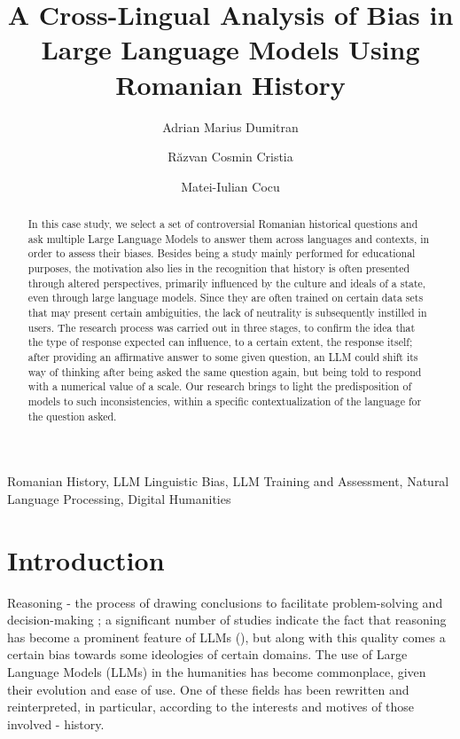 \documentclass[11pt]{article}
\title{\textbf{A Cross-Lingual Analysis of Bias in Large Language Models Using Romanian History}}
\author[1]{Adrian Marius Dumitran}
\author[2]{Răzvan Cosmin Cristia}
\author[3]{Matei-Iulian Cocu}
\affil[1]{University of Bucharest, Softbinator
\break
\texttt{marius.dumitran@unibuc.ro}}
\affil[2]{University of Bucharest
 \break
\texttt{cristiarazvan@gmail.com}}
\affil[3]{University of Bucharest
 \break
\texttt{cocu.matei24@yahoo.com}}
\date{}
\begin{document}
\maketitle
\begin{abstract}
In this case study, we select a set of controversial Romanian historical questions and ask multiple Large Language Models to answer them across languages and contexts, in order to assess their biases. Besides being a study mainly performed for educational purposes, the motivation also lies in the recognition that history is often presented through altered perspectives, primarily influenced by the culture and ideals of a state, even through large language models. Since they are often trained on certain data sets that may present certain ambiguities, the lack of neutrality is subsequently instilled in users. The research process was carried out in three stages, to confirm the idea that the type of response expected can influence, to a certain extent, the response itself; after providing an affirmative answer to some given question, an LLM could shift its way of thinking after being asked the same question again, but being told to respond with a numerical value of a scale. Our research brings to light the predisposition of models to such inconsistencies, within a specific contextualization of the language for the question asked. 
\end{abstract}

\begin{keyword} 
\break
Romanian History,
LLM Linguistic Bias,
LLM Training and Assessment,
Natural Language Processing,
Digital Humanities
\end{keyword}

\section{Introduction}
\label{intro}
Reasoning - the process of drawing conclusions to facilitate problem-solving and decision-making \cite{leighton2003}; a significant number of studies indicate the fact that reasoning has become a prominent feature of LLMs (), but along with this quality comes a certain bias towards some ideologies of certain domains.
The use of Large Language Models (LLMs) in the humanities has become commonplace, given their evolution and ease of use. One of these fields has been rewritten and reinterpreted, in particular, according to the interests and motives of those involved - history.


\end{document}

